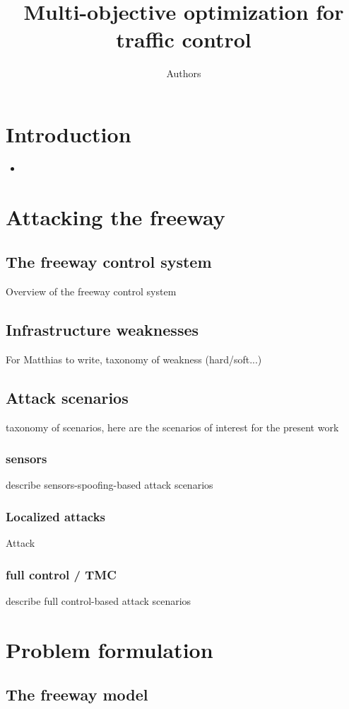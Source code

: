 \documentclass{article}
\title{Multi-objective optimization for traffic control}
\author{Authors}
\date{}							%
\theoremstyle{definition}
\theoremstyle{remark}
\begin{document}
\maketitle
\tableofcontents

\section*{Introduction}
\begin{itemize}
	\item
\end{itemize}
\section{Attacking the freeway}
	\subsection{The freeway control system}
		Overview of the freeway control system
	\subsection{Infrastructure weaknesses}
		For Matthias to write, taxonomy of weakness (hard/soft...)
	\subsection{Attack scenarios}
		taxonomy of scenarios, here are the scenarios of interest for the present work
		\subsubsection{sensors}
			describe sensors-spoofing-based attack scenarios
		\subsubsection{Localized attacks}
			Attack
		\subsubsection{full control / TMC}
			describe full control-based attack scenarios
\section{Problem formulation}			
	\subsection{The freeway model}
\end{document}
